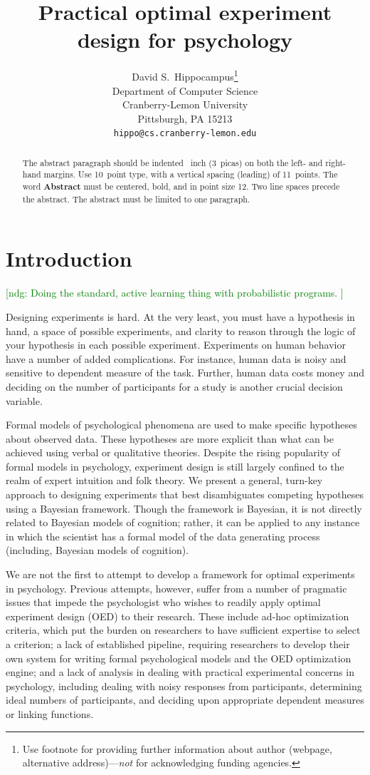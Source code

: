 \documentclass{article}
\title{Practical optimal experiment design for psychology}
\author{
  David S.~Hippocampus\thanks{Use footnote for providing further
    information about author (webpage, alternative
    address)---\emph{not} for acknowledging funding agencies.} \\
  Department of Computer Science\\
  Cranberry-Lemon University\\
  Pittsburgh, PA 15213 \\
  \texttt{hippo@cs.cranberry-lemon.edu} \\
}
\newcommand{\ndg}[1]{\textcolor{Green}{[ndg: #1]}}
\begin{document}

\maketitle

\begin{abstract}
  The abstract paragraph should be indented ~inch
  (3~picas) on both the left- and right-hand margins. Use 10~point
  type, with a vertical spacing (leading) of 11~points.  The word
  \textbf{Abstract} must be centered, bold, and in point size 12. Two
  line spaces precede the abstract. The abstract must be limited to
  one paragraph.
\end{abstract}

\section{Introduction}
\ndg{Doing the standard, active learning thing with probabilistic programs. }

Designing experiments is hard. 
At the very least, you must have a hypothesis in hand, a space of possible experiments, and clarity to reason through the logic of your hypothesis in each possible experiment. 
Experiments on human behavior have a number of added complications. 
For instance, human data is noisy and sensitive to dependent measure of the task. Further, human data costs money and deciding on the number of participants for a study is another crucial decision variable. 

Formal models of psychological phenomena are used to make specific hypotheses about observed data. 
These hypotheses are more explicit than what can be achieved using verbal or qualitative theories. Despite the rising popularity of formal models in psychology, experiment design is still largely confined to the realm of expert intuition and folk theory.
We present a general, turn-key approach to designing experiments that best disambiguates competing hypotheses using a Bayesian framework. 
Though the framework is Bayesian, it is not directly related to Bayesian models of cognition; rather, it can be applied to any instance in which the scientist has a formal model of the data generating process (including, Bayesian models of cognition). 

We are not the first to attempt to develop a framework for optimal experiments in psychology. Previous attempts, however, suffer from a number of pragmatic issues that impede the psychologist who wishes to readily apply optimal experiment design (OED) to their research.
These include ad-hoc optimization criteria, which put the burden on researchers to have sufficient expertise to select a criterion; 
a lack of established pipeline, requiring researchers to develop their own system for writing formal psychological models and the OED optimization engine; 
and a lack of analysis in dealing with practical experimental concerns in psychology, including dealing with noisy responses from participants, determining ideal numbers of participants, and deciding upon appropriate dependent measures or linking functions.
\end{document}
